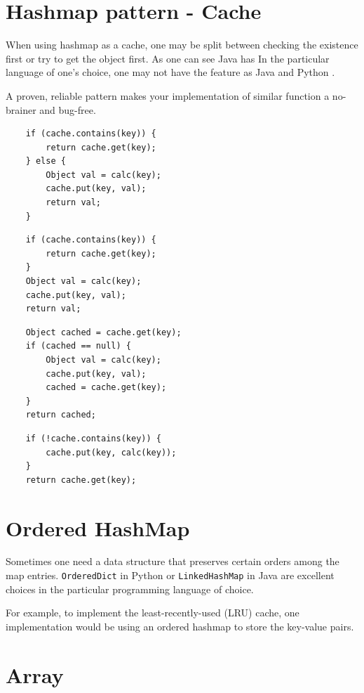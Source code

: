 \documentclass[oneside,11pt]{book}
\theoremstyle{definition}
\theoremstyle{remark}
\newcommand{\code}[1]{\mbox{\lstinline{#1}}}
\newcommand{\java}{Java }
\newcommand{\python}{Python }
\begin{document}
\section{Hashmap pattern - Cache}\label{sec:hashmappattern-cache}

When using hashmap as a cache, one may be split between checking the existence first or try to
get the object first.
As one can see \java has
In the particular language of one's choice, one may not have the feature as \java and \python.


A proven, reliable pattern makes your implementation of similar function a no-brainer and bug-free.

\begin{lstlisting}
    if (cache.contains(key)) {
        return cache.get(key);
    } else {
        Object val = calc(key);
        cache.put(key, val);
        return val;
    }
\end{lstlisting}

\begin{lstlisting}
    if (cache.contains(key)) {
        return cache.get(key);
    }
    Object val = calc(key);
    cache.put(key, val);
    return val;
\end{lstlisting}

\begin{lstlisting}
    Object cached = cache.get(key);
    if (cached == null) {
        Object val = calc(key);
        cache.put(key, val);
        cached = cache.get(key);
    }
    return cached;
\end{lstlisting}

\begin{lstlisting}
    if (!cache.contains(key)) {
        cache.put(key, calc(key));
    }
    return cache.get(key);
\end{lstlisting}

\section{Ordered HashMap}
Sometimes one need a data structure that preserves certain orders among the map entries.
\code{OrderedDict} in \python or \code{LinkedHashMap} in \java are excellent choices in the
particular programming language of choice.

For example, to implement the least-recently-used (LRU) cache, one implementation would be using
an ordered hashmap to store the key-value pairs.
\clearpage{}
    \clearpage{}

\section{Array}\label{sec:array-pattern}
\end{document}
